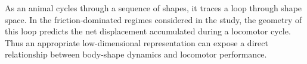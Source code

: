 As an animal cycles through a sequence of shapes, it traces a loop through shape space.
In the friction-dominated regimes considered in the study, the geometry of this loop predicts the net displacement accumulated during a locomotor cycle.
Thus an appropriate low-dimensional representation can expose a direct relationship between body-shape dynamics and locomotor performance.


